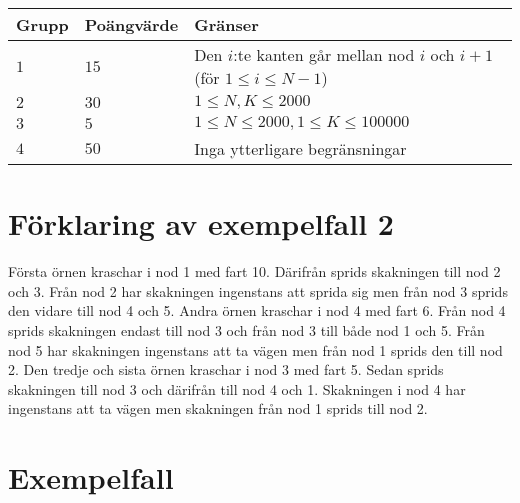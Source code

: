 \noindent
\begin{tabular}{| l | l | l |}
  \hline
  Grupp & Poängvärde & Gränser \\ \hline
  $1$    & $15$       &  Den $i$:te kanten går mellan nod $i$ och $i+1$ (för $1 \le i \le N-1$) \\ \hline 
  $2$    & $30$       &  $1 \le N,K \le 2000$ \\ \hline
  $3$    & $5$        &  $1 \le N \le 2000, 1 \le K \le 100000 $ \\ \hline
  $4$    & $50$       &  Inga ytterligare  begränsningar \\ \hline
\end{tabular}

\section*{Förklaring av exempelfall 2}
Första örnen kraschar i nod 1 med fart 10. Därifrån sprids skakningen till nod 2 och 3. Från nod 2 har skakningen ingenstans att sprida sig men från nod 3 sprids den vidare till nod 4 och 5.
Andra örnen kraschar i nod 4 med fart 6. Från nod 4 sprids skakningen endast till nod 3 och från nod 3 till både nod 1 och 5. Från nod 5 har skakningen ingenstans att ta vägen men från nod 1 sprids den till nod 2.
Den tredje och sista örnen kraschar i nod 3 med fart 5. Sedan sprids skakningen till nod 3 och därifrån till nod 4 och 1. Skakningen i nod 4 har ingenstans att ta vägen men skakningen från nod 1 sprids till nod 2.

\section*{Exempelfall}